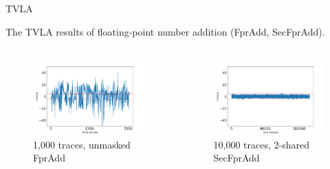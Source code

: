 \begin{frame}{TVLA}

The TVLA results of floating-point number addition (FprAdd, SecFprAdd).

\vskip -15pt
\begin{columns}[T]
\begin{figure}
\includegraphics[width=\textwidth]{figure/tvla/fpradd_1k.png}
\vspace{-20pt}
\caption{1,000 traces, unmasked FprAdd}
\end{figure}

\begin{figure}
\includegraphics[width=\textwidth]{figure/tvla/1012_SecFprAdd_2shares_10k.png}
\vspace{-20pt}
\caption{10,000 traces, 2-shared SecFprAdd}
\end{figure}


\end{columns}
\end{frame}
